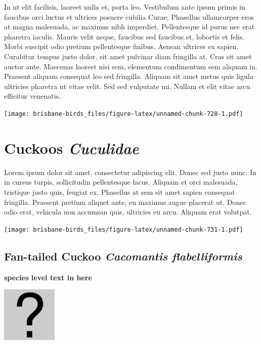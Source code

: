 \documentclass[]{book}
\let\origfigure\figure
\let\endorigfigure\endfigure
\renewenvironment{figure}[1][2] {
  \expandafter\origfigure\expandafter[H]
} {
  \endorigfigure
}
\begin{document}
In ut elit facilisis, laoreet nulla et, porta leo. Vestibulum ante ipsum
primis in faucibus orci luctus et ultrices posuere cubilia Curae;
Phasellus ullamcorper eros at magna malesuada, ac maximus nibh
imperdiet. Pellentesque id purus nec erat pharetra iaculis. Mauris velit
neque, faucibus sed faucibus et, lobortis et felis. Morbi suscipit odio
pretium pellentesque finibus. Aenean ultrices ex sapien. Curabitur
tempus justo dolor, sit amet pulvinar diam fringilla at. Cras sit amet
auctor ante. Maecenas laoreet nisi sem, elementum condimentum sem
aliquam in. Praesent aliquam consequat leo sed fringilla. Aliquam sit
amet metus quis ligula ultricies pharetra ut vitae velit. Sed sed
vulputate mi. Nullam et elit vitae arcu efficitur venenatis.

\begin{figure}
\centering
\texttt{[image: brisbane-birds\_files/figure-latex/unnamed-chunk-728-1.pdf]}
\caption{\label{fig:unnamed-chunk-728}insert figure caption}
\end{figure}

\chapter{\texorpdfstring{Cuckoos
\emph{Cuculidae}}{Cuckoos Cuculidae}}\label{cuckoos-cuculidae}

Lorem ipsum dolor sit amet, consectetur adipiscing elit. Donec sed justo
nunc. In in cursus turpis, sollicitudin pellentesque lacus. Aliquam et
orci malesuada, tristique justo quis, feugiat ex. Phasellus at sem sit
amet sapien consequat fringilla. Praesent pretium aliquet ante, eu
maximus augue placerat ut. Donec odio erat, vehicula non accumsan quis,
ultricies eu arcu. Aliquam erat volutpat.

\texttt{[image: brisbane-birds\_files/figure-latex/unnamed-chunk-731-1.pdf]}

\section{\texorpdfstring{Fan-tailed Cuckoo \emph{Cacomantis
flabelliformis}}{Fan-tailed Cuckoo Cacomantis flabelliformis}}\label{fan-tailed-cuckoo-cacomantis-flabelliformis}

\textbf{species level text in here}

\begin{figure}
\centering
\includegraphics{assets/missing.png}
\caption{No image for species}
\end{figure}
\end{document}
